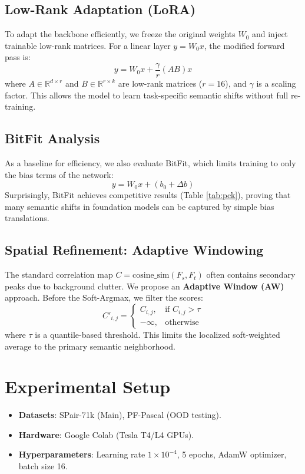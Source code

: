 \documentclass[10pt,twocolumn,letterpaper]{article}
\begin{document}
\subsection{Low-Rank Adaptation (LoRA)}
To adapt the backbone efficiently, we freeze the original weights $W_0$ and inject trainable low-rank matrices. For a linear layer $y = W_0 x$, the modified forward pass is:
\begin{equation}
    y = W_0 x + \frac{\gamma}{r} (A B) x
\end{equation}
where $A \in \mathbb{R}^{d \times r}$ and $B \in \mathbb{R}^{r \times k}$ are low-rank matrices ($r=16$), and $\gamma$ is a scaling factor. This allows the model to learn task-specific semantic shifts without full re-training.

\subsection{BitFit Analysis}
As a baseline for efficiency, we also evaluate BitFit, which limits training to only the bias terms of the network:
\begin{equation}
    y = W_0 x + (b_0 + \Delta b)
\end{equation}
Surprisingly, BitFit achieves competitive results (Table \ref{tab:pck}), proving that many semantic shifts in foundation models can be captured by simple bias translations.

\subsection{Spatial Refinement: Adaptive Windowing}
The standard correlation map $C = \text{cosine\_sim}(F_s, F_t)$ often contains secondary peaks due to background clutter. We propose an \textbf{Adaptive Window (AW)} approach. Before the Soft-Argmax, we filter the scores:
\begin{equation}
    C'_{i,j} = 
    \begin{cases} 
    C_{i,j}, & \text{if } C_{i,j} > \tau \\
    -\infty, & \text{otherwise}
    \end{cases}
\end{equation}
where $\tau$ is a quantile-based threshold. This limits the localized soft-weighted average to the primary semantic neighborhood.

\section{Experimental Setup}
\begin{itemize}
    \item \textbf{Datasets}: SPair-71k (Main), PF-Pascal (OOD testing).
    \item \textbf{Hardware}: Google Colab (Tesla T4/L4 GPUs).
    \item \textbf{Hyperparameters}: Learning rate $1 \times 10^{-4}$, 5 epochs, AdamW optimizer, batch size 16.
\end{itemize}
\end{document}
